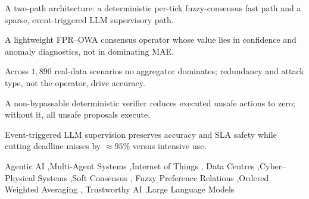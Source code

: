 \documentclass[preprint,11pt]{elsarticle}
\begin{document}
\begin{frontmatter}
\begin{abstract}
cyber--physical simulation driven by audited data-centre thermal,
workload, and anomaly-timing datasets, across $1{,}890$ scenarios
spanning seven deception/anomaly attacks. The results are deliberately
nuanced. No single aggregator dominates: simple averaging attains the
best global mean absolute error, while FPR--OWA wins under systematic
bias and, uniquely, supplies the confidence and anomaly signals on which
safe orchestration depends. The verifier proves essential---without it
every unsafe proposal is executed, with it none are---and self-refinement
increases the number of accepted safe actions at the price of latency.
Finally, intensive in-the-loop LLM supervision does not improve
estimation accuracy yet inflates loop latency past real-time deadlines,
whereas event-triggered supervision preserves estimation quality and
zero thermal-SLA violations while cutting the deadline-miss rate by
roughly $95\%$. The contribution is an architecture in which agentic
reasoning serves as sparse supervisory intelligence while the
safety-critical path stays lightweight, deterministic, fuzzy-consensus
driven, and verifier-guarded.
\end{abstract}

\begin{highlights}
\item A two-path architecture: a deterministic per-tick fuzzy-consensus
fast path and a sparse, event-triggered LLM supervisory path.
\item A lightweight FPR--OWA consensus operator whose value lies in
confidence and anomaly diagnostics, not in dominating MAE.
\item Across $1{,}890$ real-data scenarios no aggregator dominates;
redundancy and attack type, not the operator, drive accuracy.
\item A non-bypassable deterministic verifier reduces executed unsafe
actions to zero; without it, all unsafe proposals execute.
\item Event-triggered LLM supervision preserves accuracy and SLA safety
while cutting deadline misses by $\approx 95\%$ versus intensive use.
\end{highlights}

\begin{keyword}
Agentic AI \sep Multi-Agent Systems \sep Internet of Things \sep
Data Centres \sep Cyber--Physical Systems \sep Soft Consensus \sep
Fuzzy Preference Relations \sep Ordered Weighted Averaging \sep
Trustworthy AI \sep Large Language Models
\end{keyword}

\end{frontmatter}
\end{document}
